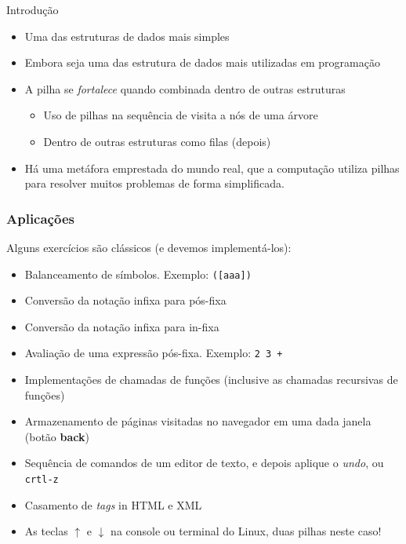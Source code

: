   \begin{frame}{Introdução}    
		\begin{itemize}
			\item Uma das estruturas de dados mais simples
			\item Embora seja uma das estrutura de dados mais utilizadas em programação
			\item A pilha se \textit{fortalece} quando combinada dentro de outras estruturas
			\begin{itemize}
			  \item Uso de pilhas na sequência de visita a nós de uma árvore
			  \item Dentro de outras estruturas como filas (depois)
			\end{itemize}
			
			\item Há uma metáfora emprestada do mundo real, que a 
			computação utiliza pilhas 
			para resolver muitos problemas de forma simplificada.
		\end{itemize}
  \end{frame}
  
  
   \begin{frame}
   \frametitle{Aplicações}


\begin{block}{Alguns exercícios são clássicos (e devemos implementá-los):}

   \begin{itemize}
     \item Balanceamento de símbolos. Exemplo: \texttt{([aaa])}
     \item Conversão da notação infixa para pós-fixa
     \item Conversão da notação infixa para in-fixa
     \item Avaliação de uma expressão pós-fixa. Exemplo: \texttt{2 3 +}
     \item Implementações de chamadas de funções (inclusive as chamadas recursivas de funções)
     \item Armazenamento de páginas visitadas no  navegador em uma dada janela (botão \textbf{back})
     \item Sequência de comandos de um editor de texto, e depois aplique  o \textit{undo}, ou \texttt{crtl-z}
     \item Casamento de \textit{tags} in HTML e XML
     \item As teclas $\uparrow $ e $\downarrow $ na console ou terminal do Linux, duas pilhas neste caso!
     
   \end{itemize}

\end{block}
  
  
  
  \end{frame}
  
